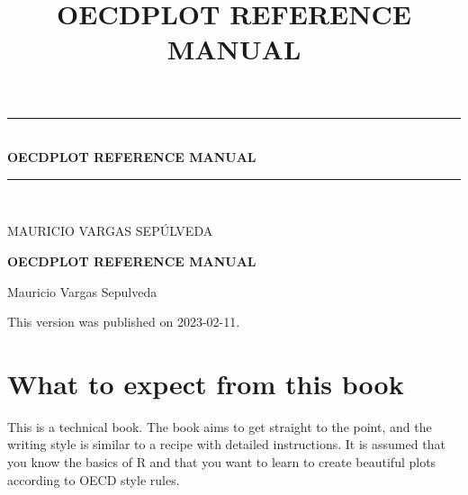 \documentclass[
  11pt,
  oneside]{report}
\title{OECDPLOT REFERENCE MANUAL}
\author{}
\date{\vspace{-2.5em}}
\begin{document}
\maketitle


\begin{center} \end{center}

\cleardoublepage

\newcommand{\HRule}{\rule{\linewidth}{0.5mm}}
\begin{titlepage}
{\sffamily 
    \begin{center}
        \vspace*{\fill}
        \rule{\linewidth}{0.5mm}\\[0.4cm]{
        \huge \bfseries OECDPLOT REFERENCE MANUAL}\\ [0.4cm]
        \rule{\linewidth}{0.5mm}\\[1.5cm]
        \begin{minipage}{0.9\textwidth}
        \begin{center}
        \large
        MAURICIO VARGAS SEP\'ULVEDA
        \end{center}
        \end{minipage}
    \vfill
    \end{center}}
\end{titlepage}
\setcounter{page}{2}

\setlength\parindent{0pt} \renewcommand{\labelenumi}{\alph{enumi}.}
\newpage

\textbf{OECDPLOT REFERENCE MANUAL}

Mauricio Vargas Sep\textquotesingle ulveda

This version was published on 2023-02-11.

\newpage
\tableofcontents
\newpage

\setcounter{page}{1}

\chapter*{What to expect from this book}

This is a technical book. The book aims to get straight to the point,
and the writing style is similar to a recipe with detailed instructions.
It is assumed that you know the basics of R and that you want to learn
to create beautiful plots according to OECD style rules.
\end{document}
